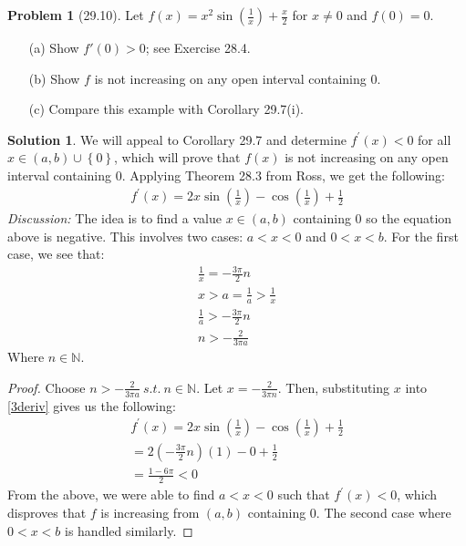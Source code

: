 \documentclass[12pt]{article}
\theoremstyle{definition} %
\newtheorem{solution}{Solution}
\newtheorem{problem}{Problem}
\theoremstyle{plain} %
\begin{document}
\begin{problem}[29.10]
    Let $ f(x) = x^2 \sin\left(\frac{1}{x}\right) + \frac{x}{2} $ for $ x \neq 0 $ and $ f(0) = 0 $.

\begin{enumerate}
    \item[(a)] Show $ f'(0) > 0 $; see Exercise 28.4.
    \item[(b)] Show $ f $ is not increasing on any open interval containing 0.
    \item[(c)] Compare this example with Corollary 29.7(i).
\end{enumerate}
\end{problem}
\begin{solution}
   We will appeal to Corollary 29.7 and determine $f^\prime (x)<0$ for all $x\in (a,b)\cup \left\{ 0 \right\}$, which will prove that $f(x)$ is not increasing on any open interval containing $0$. Applying Theorem 28.3 from Ross, we get the following:
   \begin{align}
    f^\prime (x)=2x\sin \left( \frac{1}{x} \right) -\cos\left( \frac{1}{x} \right) +\frac{1}{2} \label{3deriv}
   \end{align} 
\emph{Discussion:} The idea is to find a value $x \in (a,b)$ containing $0$ so the equation above is negative. This involves two cases: $a<x<0$ and $0<x<b$. For the first case, we see that:
\begin{align}
    \frac{1}{x} = -\frac{3\pi}{2}n \\[10pt]
    x>a = \frac{1}{a}>\frac{1}{x} \\[10pt] 
    \frac{1}{a}> -\frac{3\pi}{2}n \\[10pt] 
    n > -\frac{2}{3\pi a}
\end{align}
Where $n\in \mathbb{N} $. 
\begin{proof}
    Choose $n> -\frac{2}{3\pi a} \ s.t. \ n\in \mathbb{N} $. Let $x = -\frac{2}{3\pi n}$. Then, substituting $x$ into \autoref{3deriv} gives us the following:
    \begin{align}
        f^\prime (x)=2x\sin \left( \frac{1}{x} \right) -\cos\left( \frac{1}{x} \right) +\frac{1}{2} \\[10pt] 
        = 2\left( -\frac{3\pi}{2}n \right)\left( 1 \right) - 0 + \frac{1}{2}  \\[10pt] 
        = \frac{1-6\pi}{2}<0
    \end{align}
    From the above, we were able to find $a<x<0$ such that $f^\prime (x)<0$, which disproves that $f$ is increasing from $(a,b)$ containing $0$. The second case where $0<x<b$ is handled similarly.
\end{proof}
\end{solution}
\end{document}
